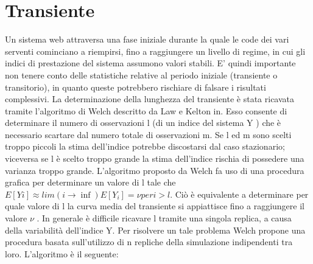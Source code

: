 \section{Transiente}
Un sistema web attraversa una fase iniziale durante la quale le code dei vari serventi cominciano a riempirsi, fino a raggiungere un livello di regime, in cui gli indici di prestazione del sistema assumono valori stabili. E’ quindi importante non tenere conto delle statistiche relative al periodo iniziale (transiente o transitorio), in quanto queste potrebbero rischiare di falsare i risultati complessivi. La determinazione della lunghezza del transiente è stata ricavata tramite l’algoritmo di Welch descritto da Law e Kelton in. Esso consente di determinare il numero di osservazioni l (di un indice del sistema Y ) che è necessario scartare dal numero totale di osservazioni m. Se l ed m sono scelti troppo piccoli la stima dell’indice potrebbe discostarsi 
dal caso stazionario; viceversa se l è scelto troppo grande la stima dell’indice rischia di possedere una varianza troppo grande. 
L’algoritmo proposto da Welch fa uso di una procedura grafica per determinare un valore di l tale che $E[Yi ] \approx lim(i \rightarrow \inf ) E[Y_{i}] = \nu per i > l $. Ciò è equivalente a determinare per quale valore di l la curva media del transiente si appiattisce fino a raggiungere il valore $\nu$ . In generale è difficile ricavare l tramite una singola replica, a causa della variabilità dell’indice Y. Per risolvere un tale problema Welch propone una procedura basata sull’utilizzo di n repliche della simulazione indipendenti tra loro. L'algoritmo è il seguente:
